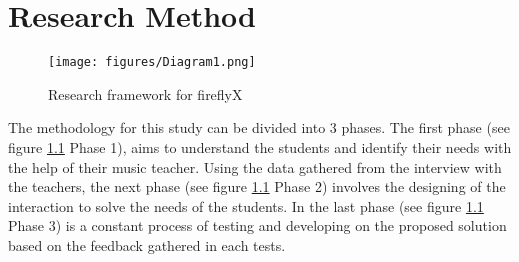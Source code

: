 %
%
%                 

\chapter{Research Method}



\begin{figure}[H]
    \centering
    \texttt{[image: figures/Diagram1.png]}
    \caption{Research framework for fireflyX}
    \label{fig:FireflyX}
\end{figure}

The methodology for this study can be divided into 3 phases. The first phase (see figure \ref{fig:FireflyX} Phase 1), aims to understand the students and identify their needs with the help of their music teacher. Using the data gathered from the interview with the teachers, the next phase (see figure \ref{fig:FireflyX} Phase 2) involves the designing of the interaction to solve the needs of the students. In the last phase (see figure \ref{fig:FireflyX} Phase 3) is a constant process of testing and developing on the proposed solution based on the feedback gathered in each tests.

